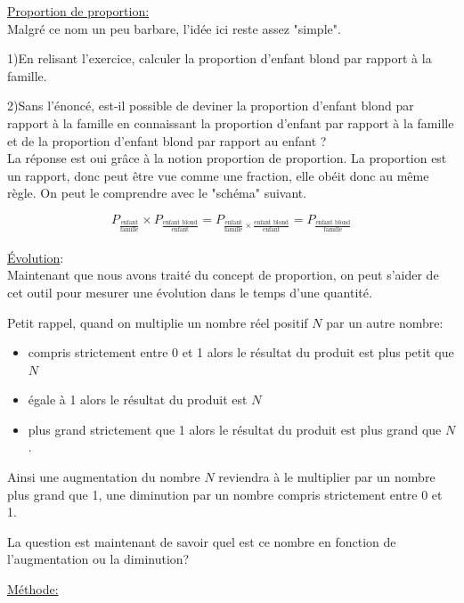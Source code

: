 \documentclass[french]{book}
\begin{document}
\underline{Proportion de proportion:}\\

Malgré ce nom un peu barbare, l’idée ici reste assez "simple".

1)En relisant l’exercice, calculer la proportion d’enfant blond par rapport à la famille.
 
2)Sans l'énoncé, est-il possible de deviner la proportion d’enfant blond par rapport à la famille en connaissant la proportion d’enfant par rapport à  la famille  et de la proportion d’enfant blond par rapport au enfant ? \\

La réponse est oui grâce à la notion proportion de proportion. La proportion est un rapport, donc peut être vue comme une fraction, elle obéit donc au même règle. On peut le comprendre avec le "schéma" suivant.

$$P_{\frac{\textrm{enfant}}{\textrm{famille}}} \times P_{\frac{\textrm{enfant blond}}{\textrm{enfant}}} = P_{\frac{\textrm{enfant}}{\textrm{famille}} \times \frac{\textrm{enfant blond}}{\textrm{enfant}} } = P_\frac{\textrm{enfant blond}}{\textrm{famille}} $$\\


\underline{Évolution}:\\

Maintenant que nous avons traité du concept de proportion, on peut s’aider de cet outil pour mesurer une évolution dans le temps d'une quantité. 

Petit rappel, quand on multiplie un nombre réel positif $N$ par un autre nombre: 
\begin{itemize}
\item compris strictement entre 0 et 1 alors le résultat du produit est plus petit que $N$
\item égale à 1 alors le résultat du produit est $N$
\item plus grand strictement que 1 alors le résultat du produit est plus grand que $N$.
\end{itemize}

Ainsi une augmentation du nombre $N$ reviendra à le multiplier par un nombre plus grand que 1, une diminution par un nombre compris strictement entre 0 et 1.

La question est maintenant de savoir quel est ce nombre en fonction de l’augmentation ou la diminution?\\

\newpage

\underline{Méthode:}\\
\end{document}
